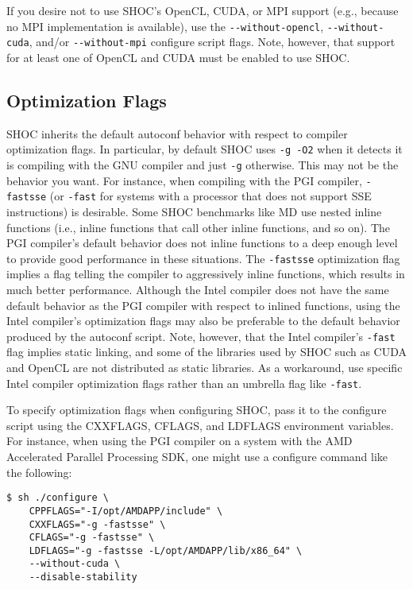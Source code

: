 \documentclass[11pt]{article}
\begin{document}
If you desire not to use SHOC's OpenCL, CUDA, or MPI support (e.g., because
no MPI implementation is available), use the \verb+--without-opencl+,
\verb+--without-cuda+,
and/or \verb+--without-mpi+ configure script flags.
Note, however, that support for at least one of OpenCL and CUDA must be
enabled to use SHOC.

\subsection{Optimization Flags}\label{sec:confoptflags}

SHOC inherits the default autoconf behavior with respect to compiler 
optimization flags.
In particular, by default SHOC uses \verb+-g -O2+ when it detects it is
compiling with the GNU compiler and just \verb+-g+ otherwise.
This may not be the behavior you want.
For instance, when compiling with the PGI compiler, \verb+-fastsse+ 
(or \verb+-fast+ for systems with a processor that does not support SSE
instructions) is desirable.
Some SHOC benchmarks like MD use nested inline functions (i.e., inline
functions that call other inline functions, and so on).
The PGI compiler's default behavior does not inline functions to a deep enough
level to provide good performance in these situations.
The \verb+-fastsse+ optimization flag implies a flag telling the compiler
to aggressively inline functions, which results in much better performance.
Although the Intel compiler does not have the same default behavior as
the PGI compiler with respect to inlined functions, using the Intel
compiler's optimization flags may also be preferable to the default behavior
produced by the autoconf script.
Note, however, that the Intel compiler's \verb+-fast+ flag implies static
linking, and some of the libraries used by SHOC such as CUDA and OpenCL 
are not distributed as static libraries.
As a workaround, use specific Intel compiler optimization flags rather than
an umbrella flag like \verb+-fast+.

To specify optimization flags when configuring SHOC, pass it to the
configure script using the CXXFLAGS, CFLAGS, and LDFLAGS environment variables.
For instance, when using the PGI compiler on a system with the 
AMD Accelerated Parallel Processing SDK, one might use a configure command 
like the following:

\begin{Verbatim}[frame=single]
$ sh ./configure \
    CPPFLAGS="-I/opt/AMDAPP/include" \
    CXXFLAGS="-g -fastsse" \
    CFLAGS="-g -fastsse" \
    LDFLAGS="-g -fastsse -L/opt/AMDAPP/lib/x86_64" \
    --without-cuda \
    --disable-stability
\end{Verbatim}
\end{document}
